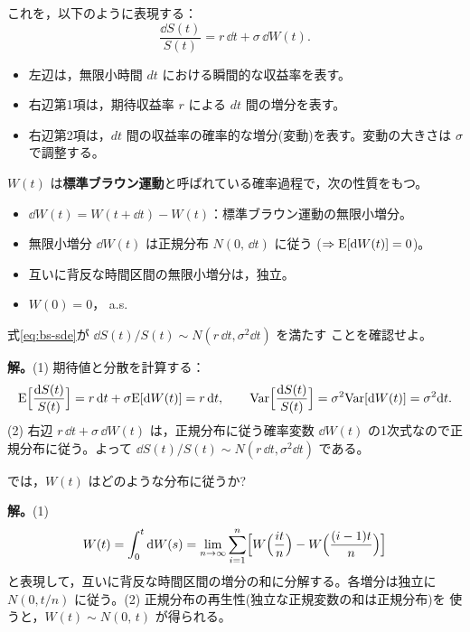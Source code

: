 これを，以下のように表現する：
\begin{equation}
\frac{\dd S(t)}{S(t)} = r\,\dd t + \sigma\,\dd W(t).
\label{eq:bs-sde}
\end{equation}
\begin{itemize}
\item 左辺は，無限小時間 $dt$ における瞬間的な収益率を表す。
\item 右辺第1項は，期待収益率 $r$ による $dt$ 間の増分を表す。
\item 右辺第2項は，$dt$ 間の収益率の確率的な増分(変動)を表す。変動の大きさは
$\sigma$ で調整する。
\end{itemize}

\begin{definition}[標準ブラウン運動]
$W(t)$ は\textbf{標準ブラウン運動}と呼ばれている確率過程で，次の性質をもつ。
\begin{itemize}
\item $\dd W(t) = W(t+\dd t) - W(t)$：標準ブラウン運動の無限小増分。
\item 無限小増分 $\dd W(t)$ は正規分布 $N(0,\,\dd t)$ に従う
($\Rightarrow \mathrm{E}[\mathrm{d} W(t)] = 0$)。
\item 互いに背反な時間区間の無限小増分は，独立。
\item $W(0) = 0$， a.s.
\end{itemize}
\end{definition}

\begin{example}[問1]
式\eqref{eq:bs-sde}が $\dd S(t)/S(t) \sim N(r\,\dd t, \sigma^2\dd t)$ を満たす
ことを確認せよ。

\textbf{解。}(1) 期待値と分散を計算する：
\[
\mathrm{E}\Bigl[\frac{\mathrm{d} S(t)}{S(t)}\Bigr] = r\,\mathrm{d} t + \sigma\mathrm{E}[\mathrm{d} W(t)] = r\,\mathrm{d} t,
\qquad
\mathrm{Var}\Bigl[\frac{\mathrm{d} S(t)}{S(t)}\Bigr] = \sigma^2\mathrm{Var}[\mathrm{d} W(t)] = \sigma^2\mathrm{d} t.
\]
(2) 右辺 $r\,\dd t + \sigma\,\dd W(t)$ は，正規分布に従う確率変数
$\dd W(t)$ の1次式なので正規分布に従う。よって
$\dd S(t)/S(t) \sim N(r\,\dd t, \sigma^2\dd t)$ である。
\end{example}

\begin{example}[問2]
では，$W(t)$ はどのような分布に従うか?

\textbf{解。}(1)
\[
W(t) = \int_0^t \mathrm{d} W(s)
= \lim_{n\to\infty}\sum_{i=1}^{n}
\Bigl[W\Bigl(\frac{it}{n}\Bigr) - W\Bigl(\frac{(i-1)t}{n}\Bigr)\Bigr]
\]
と表現して，互いに背反な時間区間の増分の和に分解する。各増分は独立に
$N(0, t/n)$ に従う。(2) 正規分布の再生性(独立な正規変数の和は正規分布)を
使うと，$W(t) \sim N(0,\,t)$ が得られる。
\end{example}


